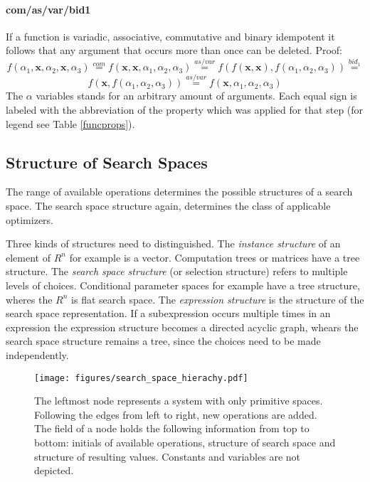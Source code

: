 \documentclass[english]{article}
\begin{document}
\paragraph{com/as/var/bid1}
If a function is variadic, associative, commutative and binary idempotent it follows that any argument that occurs more than once can be deleted. Proof:
$$f(\alpha_1, \mathbf{x}, \alpha_2, \mathbf{x}, \alpha_3) \stackrel{com}{=}
f(\mathbf{x},\mathbf{x}, \alpha_1, \alpha_2, \alpha_3) \stackrel{as/var}{=}
f(f(\mathbf{x},\mathbf{x}), f(\alpha_1, \alpha_2, \alpha_3)) \stackrel{bid_1}{=}$$
$$f(\mathbf{x}, f(\alpha_1, \alpha_2, \alpha_3)) \stackrel{as/var}{=}
f(\mathbf{x}, \alpha_1, \alpha_2, \alpha_3)$$
The $\alpha$ variables stands for an arbitrary amount of arguments. Each equal sign is labeled with the abbreviation of the property which was applied for that step (for legend see Table \ref{funcprops}).


\subsection{Structure of Search Spaces}
The range of available operations determines the possible structures of a search space. The search space structure again, determines the class of applicable optimizers.

Three kinds of structures need to distinguished. The \textit{instance structure} of an element of $R^n$ for example is a vector. Computation trees or matrices have a tree structure. The \textit{search space structure} (or selection structure) refers to multiple levels of choices. Conditional parameter spaces for example have a tree structure, wheres the $R^n$ is flat search space. The \textit{expression structure} is the structure of the search space representation. If a subexpression occurs multiple times in an expression the expression structure becomes a directed acyclic graph, whears the search space structure remains a tree, since the choices need to be made independently.

\begin{figure}[h]
\texttt{[image: figures/search\_space\_hierachy.pdf]}
  \caption{The leftmost node represents a system with only primitive spaces. Following the edges from left to right, new operations are added. The field of a node holds the following information from top to bottom: initials of available operations, structure of search space and structure of resulting values. Constants and variables are not depicted.}
  \label{space_structure}
\end{figure}
\end{document}

